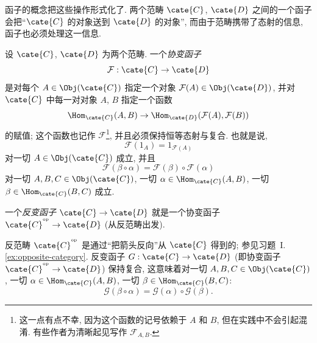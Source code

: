 函子的概念把这些操作形式化了. 两个范畴 $\cate{C}$, $\cate{D}$ 之间的一个函子会把``$\cate{C}$ 的对象送到 $\cate{D}$ 的对象'', 而由于范畴携带了态射的信息, 函子也必须处理这一信息.

\begin{definition}\label{def:functor}
设 $\cate{C}$, $\cate{D}$ 为两个范畴. 一个\emph{协变函子}
\[
\mathcal{F}:\cate{C}\to\cate{D}
\]
是对每个 $A\in\Obj(\cate{C})$ 指定一个对象 $\mathcal{F}(A)\in\Obj(\cate{D})$, 并对 $\cate{C}$ 中每一对对象 $A$, $B$ 指定一个函数
\[
\Hom_{\cate{C}}(A,B)\to\Hom_{\cate{D}}(\mathcal{F}(A),\mathcal{F}(B))
\]
的赋值; 这个函数也记作 $\mathcal{F}$\footnote{这一点有点不幸, 因为这个函数的记号依赖于 $A$ 和 $B$, 但在实践中不会引起混淆. 有些作者为清晰起见写作 $\mathcal{F}_{A,B}$.}, 并且必须保持恒等态射与复合. 也就是说,
\[
\mathcal{F}(1_A)=1_{\mathcal{F}(A)}
\]
对一切 $A\in\Obj(\cate{C})$ 成立, 并且
\[
\mathcal{F}(\beta\circ\alpha)=\mathcal{F}(\beta)\circ\mathcal{F}(\alpha)
\]
对一切 $A,B,C\in\Obj(\cate{C})$, 一切 $\alpha\in\Hom_{\cate{C}}(A,B)$, 一切 $\beta\in\Hom_{\cate{C}}(B,C)$ 成立.

一个\emph{反变函子} $\cate{C}\to\cate{D}$ 就是一个协变函子 $\cate{C}^{\op}\to\cate{D}$ (从反范畴出发).
\end{definition}

反范畴 $\cate{C}^{\op}$ 是通过``把箭头反向''从 $\cate{C}$ 得到的; 参见习题~I.\ref{ex:opposite-category}. 反变函子 $G:\cate{C}\to\cate{D}$ (即协变函子 $\cate{C}^{\op}\to\cate{D}$) 保持复合, 这意味着对一切 $A,B,C\in\Obj(\cate{C})$, 一切 $\alpha\in\Hom_{\cate{C}}(A,B)$, 一切 $\beta\in\Hom_{\cate{C}}(B,C)$:
\[
\mathcal{G}(\beta\circ\alpha)=\mathcal{G}(\alpha)\circ\mathcal{G}(\beta).
\]

